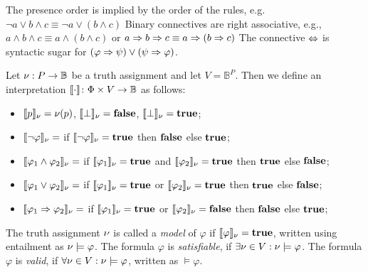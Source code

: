 \begin{remark}
    The presence order is implied by the order of the rules, e.g. $\neg a \lor b\land c \equiv  \neg a \lor (b\land c)$
    Binary connectives are right associative, e.g., 
    $ a \land b \land c \equiv   a \land (b \land c)$ or $ a \Rightarrow b \Rightarrow c \equiv   a \Rightarrow (b \Rightarrow c)$
    The connective $\Leftrightarrow$ is syntactic sugar for $(\varphi \Rightarrow \psi) \lor (\psi \Rightarrow \varphi)$.
\end{remark}




\begin{definition}[Semantics]
    Let $ \nu: P \rightarrow \mathbb{B}$ be a truth assignment and let $V = \mathbb{B}^P$. Then we define an interpretation $\llbracket \cdot \rrbracket\colon \Phi \times V \to \mathbb{B}$ as follows:
    \begin{itemize}
        \item $\llbracket p \rrbracket_{\nu} = \nu(p)$,  $\llbracket \bot \rrbracket_{\nu} = \mathbf{false}$,
        $\llbracket \bot \rrbracket_{\nu} = \mathbf{true}$;
        \item $\llbracket \neg\varphi \rrbracket_{\nu} =$ if $\llbracket \neg\varphi \rrbracket_{\nu}=\mathbf{true}$ then $\mathbf{false}$ else $\mathbf{true}$;
        \item $\llbracket \varphi_1 \land \varphi_2 \rrbracket_{\nu}=$ if $\llbracket \varphi_1 \rrbracket_{\nu}=\mathbf{true}$ and $\llbracket \varphi_2 \rrbracket_{\nu}=\mathbf{true}$ then $\mathbf{true}$ else $\mathbf{false}$;
        \item $\llbracket \varphi_1 \lor \varphi_2 \rrbracket_{\nu}=$ if $\llbracket \varphi_1 \rrbracket_{\nu}=\mathbf{true}$ or $\llbracket \varphi_2 \rrbracket_{\nu}=\mathbf{true}$ then $\mathbf{true}$ else $\mathbf{false}$;
        \item $\llbracket \varphi_1 \Rightarrow \varphi_2 \rrbracket_{\nu}=$ if $\llbracket \varphi_1 \rrbracket_{\nu}=\mathbf{true}$ or $\llbracket \varphi_2 \rrbracket_{\nu}=\mathbf{false}$ then $\mathbf{false}$ else $\mathbf{true}$;
        \end{itemize}
\end{definition}

\begin{definition}
    The truth assignment $\nu$ is called a \emph{model} of $\varphi$ if $\llbracket \varphi \rrbracket_{\nu}=\mathbf{true}$, written using entailment as $ \nu \models \varphi$.
    The formula $\varphi$ is \emph{satisfiable}, if $\exists \nu\in V : \nu \models \varphi$.
    The formula $\varphi$ is \emph{valid}, if $\forall \nu\in V : \nu \models \varphi$, written as $\models \varphi$.
\end{definition}

